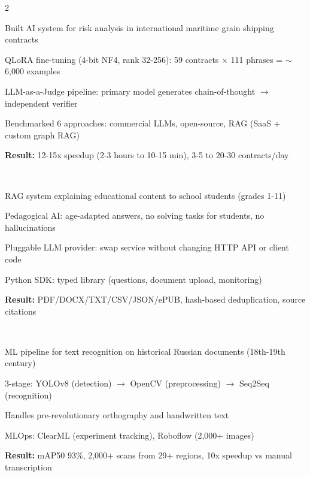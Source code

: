 \documentclass[]{deedy-resume-reversed}
\begin{document}
\begin{paracol}{2}
\\
\begin{tightemize}
\item Built AI system for risk analysis in international maritime grain shipping contracts
\item QLoRA fine-tuning (4-bit NF4, rank 32-256): 59 contracts $\times$ 111 phrases = $\sim$6,000 examples
\item LLM-as-a-Judge pipeline: primary model generates chain-of-thought $\rightarrow$ independent verifier
\item Benchmarked 6 approaches: commercial LLMs, open-source, RAG (SaaS + custom graph RAG)
\item \textbf{Result:} 12-15x speedup (2-3 hours to 10-15 min), 3-5 to 20-30 contracts/day
\end{tightemize}
\sectionsep

\\
\begin{tightemize}
\item RAG system explaining educational content to school students (grades 1-11)
\item Pedagogical AI: age-adapted answers, no solving tasks for students, no hallucinations
\item Pluggable LLM provider: swap service without changing HTTP API or client code
\item Python SDK: typed library (questions, document upload, monitoring)
\item \textbf{Result:} PDF/DOCX/TXT/CSV/JSON/ePUB, hash-based deduplication, source citations
\end{tightemize}
\sectionsep

\\
\begin{tightemize}
\item ML pipeline for text recognition on historical Russian documents (18th-19th century)
\item 3-stage: YOLOv8 (detection) $\rightarrow$ OpenCV (preprocessing) $\rightarrow$ Seq2Seq (recognition)
\item Handles pre-revolutionary orthography and handwritten text
\item MLOps: ClearML (experiment tracking), Roboflow (2,000+ images)
\item \textbf{Result:} mAP50 93\%, 2,000+ scans from 29+ regions, 10x speedup vs manual transcription
\end{tightemize}
\sectionsep


\end{paracol}
\end{document}
